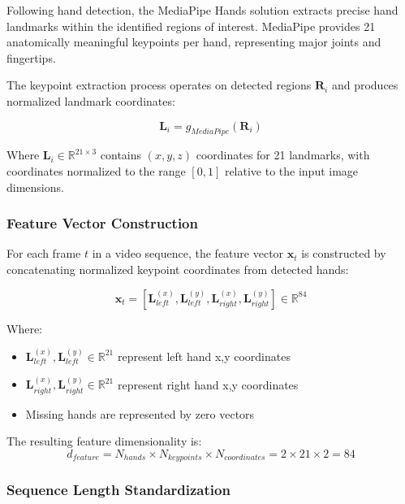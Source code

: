 \documentclass[11pt, a4paper]{article}
\begin{document}
Following hand detection, the MediaPipe Hands solution extracts precise hand landmarks within the identified regions of interest. MediaPipe provides 21 anatomically meaningful keypoints per hand, representing major joints and fingertips.

The keypoint extraction process operates on detected regions $\mathbf{R}_i$ and produces normalized landmark coordinates:

\begin{equation}
\mathbf{L}_i = g_{MediaPipe}(\mathbf{R}_i)
\end{equation}

Where $\mathbf{L}_i \in \mathbb{R}^{21 \times 3}$ contains $(x, y, z)$ coordinates for 21 landmarks, with coordinates normalized to the range $[0, 1]$ relative to the input image dimensions.

\subsubsection{Feature Vector Construction}

For each frame $t$ in a video sequence, the feature vector $\mathbf{x}_t$ is constructed by concatenating normalized keypoint coordinates from detected hands:

\begin{equation}
\mathbf{x}_t = [\mathbf{L}_{left}^{(x)}, \mathbf{L}_{left}^{(y)}, \mathbf{L}_{right}^{(x)}, \mathbf{L}_{right}^{(y)}] \in \mathbb{R}^{84}
\end{equation}

Where:
\begin{itemize}
    \item $\mathbf{L}_{left}^{(x)}, \mathbf{L}_{left}^{(y)} \in \mathbb{R}^{21}$ represent left hand x,y coordinates
    \item $\mathbf{L}_{right}^{(x)}, \mathbf{L}_{right}^{(y)} \in \mathbb{R}^{21}$ represent right hand x,y coordinates
    \item Missing hands are represented by zero vectors
\end{itemize}

The resulting feature dimensionality is:
\begin{equation}
d_{feature} = N_{hands} \times N_{keypoints} \times N_{coordinates} = 2 \times 21 \times 2 = 84
\end{equation}

\subsubsection{Sequence Length Standardization}
\end{document}
